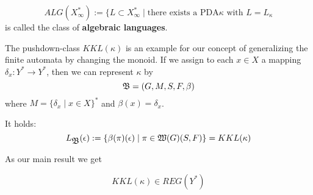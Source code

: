 \begin{definition}
\[ ALG(X_\infty^*) := \{ L \subset X_\infty^* \mid \text{there exists a PDA
$\kappa$ with $L = L_\kappa$} \]
is called the class of {\bf algebraic languages}.
\end{definition}

The pushdown-class $KKL(\kappa)$ is an example for our concept of generalizing
the finite automata by changing the monoid. If we assign to each $x\in X$ a
mapping $\delta_x: Y^* \to Y^*$, then we can represent $\kappa$ by
\[ \mbox{$\mathfrak{B}$} = (G, M, S, F, \beta) \]
where $M = \{ \delta_x \mid x\in X \}^*$ and $\beta(x) = \delta_x$.

It holds:
\[ L_{\mbox{$\mathfrak{B}$}}(\epsilon) := \{ \beta(\pi)(\epsilon) \mid \pi \in
\mbox{$\mathfrak{W}(G)$}(S, F) \} = KKL(\kappa) \]

As our main result we get
\begin{theorem}
\[ KKL(\kappa) \in REG(Y^*) \]
\end{theorem}

